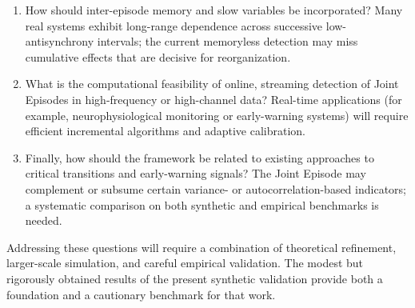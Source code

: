 \begin{enumerate}
    \item How should inter-episode memory and slow variables be incorporated? Many real systems exhibit long-range dependence across successive low-antisynchrony intervals; the current memoryless detection may miss cumulative effects that are decisive for reorganization.

    \item What is the computational feasibility of online, streaming detection of Joint Episodes in high-frequency or high-channel data? Real-time applications (for example, neurophysiological monitoring or early-warning systems) will require efficient incremental algorithms and adaptive calibration.

    \item Finally, how should the framework be related to existing approaches to critical transitions and early-warning signals? The Joint Episode may complement or subsume certain variance- or autocorrelation-based indicators; a systematic comparison on both synthetic and empirical benchmarks is needed.
\end{enumerate}

Addressing these questions will require a combination of theoretical refinement, larger-scale simulation, and careful empirical validation. The modest but rigorously obtained results of the present synthetic validation provide both a foundation and a cautionary benchmark for that work.